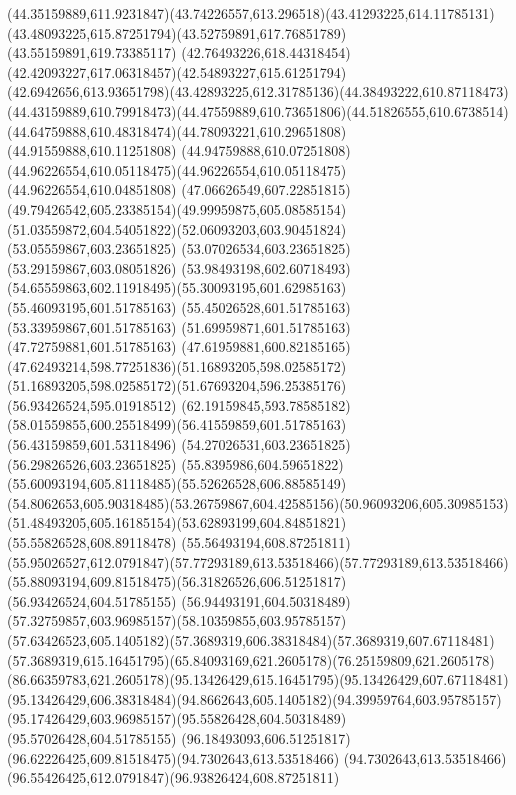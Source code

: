 {{\curveto(44.35159889,611.9231847)(43.74226557,613.296518)(43.41293225,614.11785131)
\curveto(43.48093225,615.87251794)(43.52759891,617.76851789)(43.55159891,619.73385117)
\curveto(42.76493226,618.44318454)(42.42093227,617.06318457)(42.54893227,615.61251794)
\curveto(42.6942656,613.93651798)(43.42893225,612.31785136)(44.38493222,610.87118473)
\curveto(44.43159889,610.79918473)(44.47559889,610.73651806)(44.51826555,610.6738514)
\curveto(44.64759888,610.48318474)(44.78093221,610.29651808)(44.91559888,610.11251808)
\curveto(44.94759888,610.07251808)(44.96226554,610.05118475)(44.96226554,610.05118475)
\lineto(44.96226554,610.04851808)
\curveto(47.06626549,607.22851815)(49.79426542,605.23385154)(49.99959875,605.08585154)
\curveto(51.03559872,604.54051822)(52.06093203,603.90451824)(53.05559867,603.23651825)
\lineto(53.07026534,603.23651825)
\lineto(53.29159867,603.08051826)
\curveto(53.98493198,602.60718493)(54.65559863,602.11918495)(55.30093195,601.62985163)
\lineto(55.46093195,601.51785163)
\lineto(55.45026528,601.51785163)
\lineto(53.33959867,601.51785163)
\lineto(51.69959871,601.51785163)
\lineto(47.72759881,601.51785163)
\curveto(47.61959881,600.82185165)(47.62493214,598.77251836)(51.16893205,598.02585172)
\curveto(51.16893205,598.02585172)(51.67693204,596.25385176)(56.93426524,595.01918512)
\curveto(62.19159845,593.78585182)(58.01559855,600.25518499)(56.41559859,601.51785163)
\lineto(56.43159859,601.53118496)
\lineto(54.27026531,603.23651825)
\lineto(56.29826526,603.23651825)
\curveto(55.8395986,604.59651822)(55.60093194,605.81118485)(55.52626528,606.88585149)
\curveto(54.8062653,605.90318485)(53.26759867,604.42585156)(50.96093206,605.30985153)
\curveto(51.48493205,605.16185154)(53.62893199,604.84851821)(55.55826528,608.89118478)
\lineto(55.56493194,608.87251811)
\curveto(55.95026527,612.0791847)(57.77293189,613.53518466)(57.77293189,613.53518466)
\curveto(55.88093194,609.81518475)(56.31826526,606.51251817)(56.93426524,604.51785155)
\curveto(56.94493191,604.50318489)(57.32759857,603.96985157)(58.10359855,603.95785157)
\curveto(57.63426523,605.1405182)(57.3689319,606.38318484)(57.3689319,607.67118481)
\curveto(57.3689319,615.16451795)(65.84093169,621.2605178)(76.25159809,621.2605178)
\curveto(86.66359783,621.2605178)(95.13426429,615.16451795)(95.13426429,607.67118481)
\curveto(95.13426429,606.38318484)(94.8662643,605.1405182)(94.39959764,603.95785157)
\curveto(95.17426429,603.96985157)(95.55826428,604.50318489)(95.57026428,604.51785155)
\curveto(96.18493093,606.51251817)(96.62226425,609.81518475)(94.7302643,613.53518466)
\curveto(94.7302643,613.53518466)(96.55426425,612.0791847)(96.93826424,608.87251811)
}}
